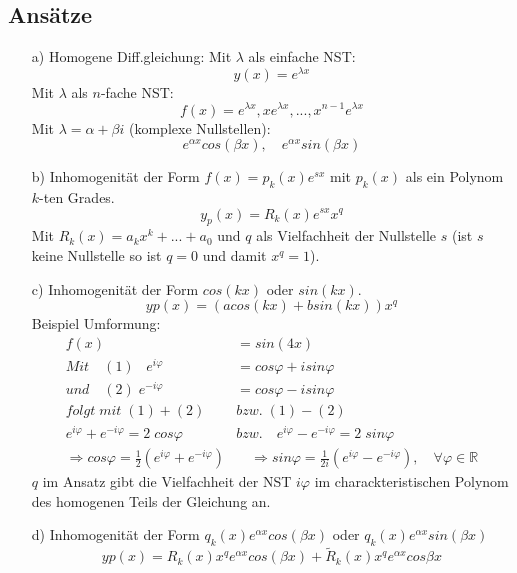 \documentclass[12pt,a4paper]{article}%
\numberwithin{equation}{section}
\newcommand{\R}{\mathbb{R}} %
\numberwithin{equation}{subsection}
\begin{document}
  \subsection{Ansätze}
  \begin{itemize}
    \item[a)] Homogene Diff.gleichung:
    Mit $\lambda$ als einfache NST:
    \begin{equation}
      y(x) = e^{\displaystyle\lambda x} \label{eq:dgl_Ansatz_a}
    \end{equation}
    Mit $\lambda$ als $n$-fache NST:
    \begin{equation}
      f(x) = e^{\displaystyle\lambda x}, xe^{\displaystyle\lambda x}, ..., x^{n-1}e^{\displaystyle\lambda x} 
    \end{equation}
    Mit $\lambda = \alpha + \beta i$ (komplexe Nullstellen):
    \begin{equation}
      e^{\alpha x}cos(\beta x),\quad e^{\alpha x} sin(\beta x)
    \end{equation}
    \item[b)] Inhomogenität der Form $f(x) = p_k(x) e^{sx}$ mit $p_k(x)$ als ein Polynom $k$-ten Grades.
    \begin{equation}
      y_p(x) = R_k(x)e^{sx}x^q
    \end{equation}
    Mit $R_k(x) = a_kx^k+...+a_0$ und $q$ als Vielfachheit der Nullstelle $s$ (ist $s$ keine Nullstelle so ist $q = 0$ und damit $x^q = 1$).
    \item[c)] Inhomogenität der Form $cos(kx)$ oder $sin(kx)$.
    \begin{equation}
      yp(x) = (a cos(kx) + b sin(kx)) x^q
    \end{equation}
    Beispiel Umformung:
    \begin{align}
      f(x) &= sin(4x)\nonumber\\
      Mit \quad
      (1)\;\;\; e^{i\varphi} &= cos \varphi + i sin\varphi\nonumber \\
      und \quad
      (2)\; e^{-i\varphi} &= cos \varphi - i sin \varphi\nonumber\\
      folgt \;mit \;(1) + (2) \;&bzw.\; (1)-(2)\nonumber\\
      e^{i\varphi} + e^{-i\varphi} = 2\;cos\varphi \quad &bzw. \quad e^{i\varphi}-e^{-i\varphi} = 2 \; sin\varphi\nonumber\\
      \Rightarrow cos \varphi = \frac{1}{2} (e^{i\varphi}+e^{-i\varphi}) &\quad \Rightarrow sin \varphi = \frac{1}{2i} (e^{i\varphi}-e^{-i\varphi}),\quad \forall \varphi \in \R
    \end{align}
    $q$ im Ansatz gibt die Vielfachheit der NST $i \varphi$ im charackteristischen Polynom des homogenen Teils der Gleichung an.
    \item[d)] Inhomogenität der Form $q_k(x)e^{\alpha x} cos(\beta x)$ oder $q_k(x)e^{\alpha x} sin(\beta x)$
    \begin{equation}
      yp(x) = R_k(x)x^qe^{\alpha x}cos(\beta x) + \tilde{R}_k(x) x^qe^{\alpha x}cos{\beta x}
    \end{equation}
  \end{itemize}
\end{document}
